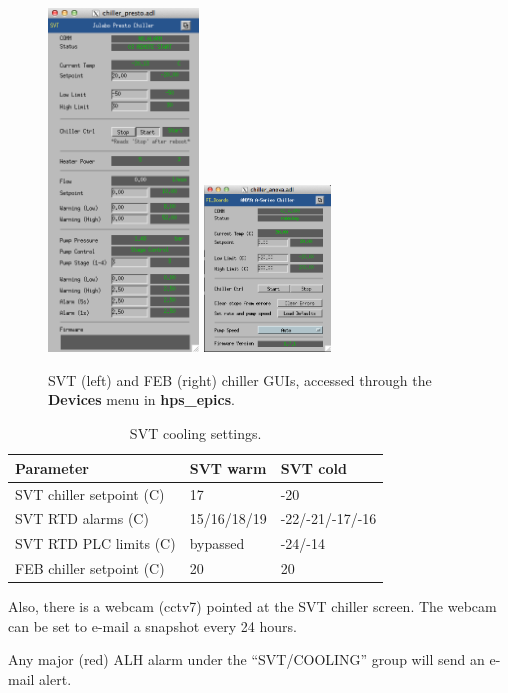 \begin{figure}[!ht]
    \begin{center}
        \includegraphics[width=4cm]{figures/svt_svtChiller.png}
        \includegraphics[width=0.3\textwidth]{figures/svt_febChiller.png}
        \caption{SVT (left) and FEB (right) chiller GUIs, accessed through the \textbf{Devices} menu in \textbf{hps\_epics}.}
        \label{fig:ctrl_cooling_chillers}
    \end{center}
\end{figure}

\begin{table}[h]
\begin{center}
\begin{tabular}{|l|l|l|}
\hline
Parameter & SVT warm & SVT cold \\
\hline
SVT chiller setpoint (C) & 17 & -20 \\
SVT RTD alarms (C) & 15/16/18/19 & -22/-21/-17/-16 \\
SVT RTD PLC limits (C) & bypassed & -24/-14 \\
FEB chiller setpoint (C) & 20 & 20 \\
\hline
\end{tabular}
\end{center}
\caption{SVT cooling settings.}
\end{table}

Also, there is a webcam (cctv7) pointed at the SVT chiller screen. The webcam can be set to e-mail a snapshot every 24 hours.

Any major (red) ALH alarm under the ``SVT/COOLING'' group will send an e-mail alert.
